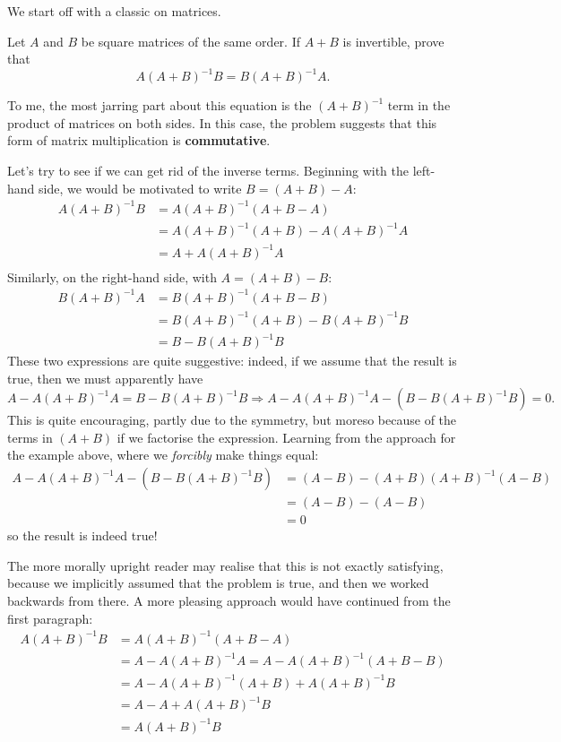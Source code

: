 \documentclass[../main.tex]{subfiles}
\begin{document}
We start off with a classic on matrices.
\begin{example}[Classic]
Let $A$ and $B$ be square matrices of the same order. If $A+B$ is invertible, prove that $$A(A+B)^{-1}B=B(A+B)^{-1}A.$$
\end{example}
To me, the most jarring part about this equation is the $(A+B)^{-1}$ term in the product of matrices on both sides. In this case, the problem suggests that this form of matrix multiplication is \textbf{commutative}.

Let's try to see if we can get rid of the inverse terms. Beginning with the left-hand side, we would be motivated to write $B=(A+B)-A$:
\begin{align*}
    A(A+B)^{-1}B &= A(A+B)^{-1}(A+B-A) \\
    &= A(A+B)^{-1}(A+B)-A(A+B)^{-1}A \\
    &= A+A(A+B)^{-1}A \\
\end{align*}
Similarly, on the right-hand side, with $A=(A+B)-B$:
\begin{align*}
    B(A+B)^{-1}A &= B(A+B)^{-1}(A+B-B) \\
    &= B(A+B)^{-1}(A+B)-B(A+B)^{-1}B \\
    &= B-B(A+B)^{-1}B
\end{align*}
These two expressions are quite suggestive: indeed, if we assume that the result is true, then we must apparently have 
$$A-A(A+B)^{-1}A=B-B(A+B)^{-1}B \Longrightarrow A-A(A+B)^{-1}A-(B-B(A+B)^{-1}B)=0.$$
This is quite encouraging, partly due to the symmetry, but moreso because of the terms in $(A+B)$ if we factorise the expression. Learning from the approach for the example above, where we \textit{forcibly} make things equal:
\begin{align*}
    A-A(A+B)^{-1}A-(B-B(A+B)^{-1}B) &= (A-B)-(A+B)(A+B)^{-1}(A-B) \\
    &= (A-B)-(A-B) \\
    &= 0
\end{align*}
so the result is indeed true!

The more morally upright reader may realise that this is not exactly satisfying, because we implicitly assumed that the problem is true, and then we worked backwards from there. A more pleasing approach would have continued from the first paragraph:
\begin{align*}
    A(A+B)^{-1}B &= A(A+B)^{-1}(A+B-A) \\
    &= A-A(A+B)^{-1}A = A-A(A+B)^{-1}(A+B-B) \\
    &= A-A(A+B)^{-1}(A+B)+A(A+B)^{-1}B \\
    &= A-A+A(A+B)^{-1}B \\
    &= A(A+B)^{-1}B
\end{align*}
\end{document}
